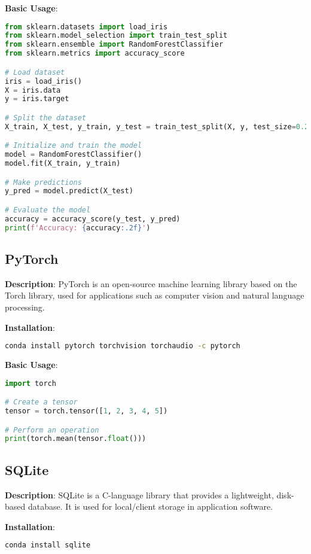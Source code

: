 \documentclass{article}
\begin{document}
\textbf{Basic Usage}:
\begin{lstlisting}[language=python]
from sklearn.datasets import load_iris
from sklearn.model_selection import train_test_split
from sklearn.ensemble import RandomForestClassifier
from sklearn.metrics import accuracy_score

# Load dataset
iris = load_iris()
X = iris.data
y = iris.target

# Split the dataset
X_train, X_test, y_train, y_test = train_test_split(X, y, test_size=0.2, random_state=42)

# Initialize and train the model
model = RandomForestClassifier()
model.fit(X_train, y_train)

# Make predictions
y_pred = model.predict(X_test)

# Evaluate the model
accuracy = accuracy_score(y_test, y_pred)
print(f'Accuracy: {accuracy:.2f}')
\end{lstlisting}

\subsection{PyTorch}
\textbf{Description}: PyTorch is an open-source machine learning library based on the Torch library, used for applications such as computer vision and natural language processing.

\textbf{Installation}:
\begin{lstlisting}[language=bash]
conda install pytorch torchvision torchaudio -c pytorch
\end{lstlisting}

\textbf{Basic Usage}:
\begin{lstlisting}[language=python]
import torch

# Create a tensor
tensor = torch.tensor([1, 2, 3, 4, 5])

# Perform an operation
print(torch.mean(tensor.float()))
\end{lstlisting}

\subsection{SQLite}
\textbf{Description}: SQLite is a C-language library that provides a lightweight, disk-based database. It is used for local/client storage in application software.

\textbf{Installation}:
\begin{lstlisting}[language=bash]
conda install sqlite
\end{lstlisting}
\end{document}
